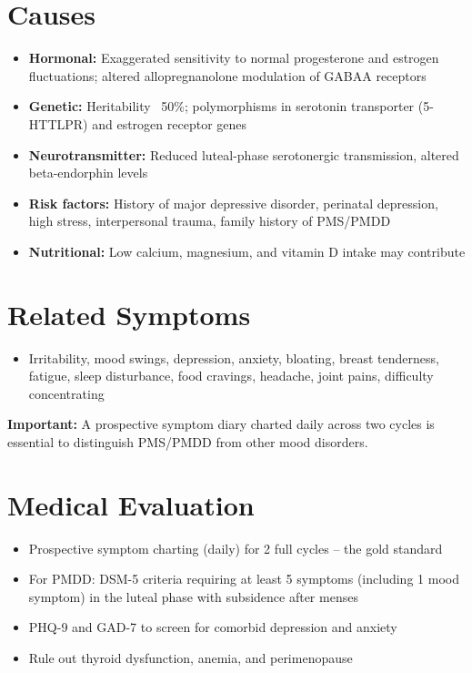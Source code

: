 \section*{Causes}
\begin{itemize}
  \item \textbf{Hormonal:} Exaggerated sensitivity to normal progesterone and estrogen fluctuations; altered allopregnanolone modulation of GABAA receptors
  \item \textbf{Genetic:} Heritability ~50\%; polymorphisms in serotonin transporter (5-HTTLPR) and estrogen receptor genes
  \item \textbf{Neurotransmitter:} Reduced luteal-phase serotonergic transmission, altered beta-endorphin levels
  \item \textbf{Risk factors:} History of major depressive disorder, perinatal depression, high stress, interpersonal trauma, family history of PMS/PMDD
  \item \textbf{Nutritional:} Low calcium, magnesium, and vitamin D intake may contribute
\end{itemize}

\section*{Related Symptoms}
\begin{itemize}
  \item Irritability, mood swings, depression, anxiety, bloating, breast tenderness, fatigue, sleep disturbance, food cravings, headache, joint pains, difficulty concentrating
\end{itemize}
\textbf{Important:} A prospective symptom diary charted daily across two cycles is essential to distinguish PMS/PMDD from other mood disorders.

\section*{Medical Evaluation}
\begin{itemize}
  \item Prospective symptom charting (daily) for 2 full cycles -- the gold standard
  \item For PMDD: DSM-5 criteria requiring at least 5 symptoms (including 1 mood symptom) in the luteal phase with subsidence after menses
  \item PHQ-9 and GAD-7 to screen for comorbid depression and anxiety
  \item Rule out thyroid dysfunction, anemia, and perimenopause
\end{itemize}

